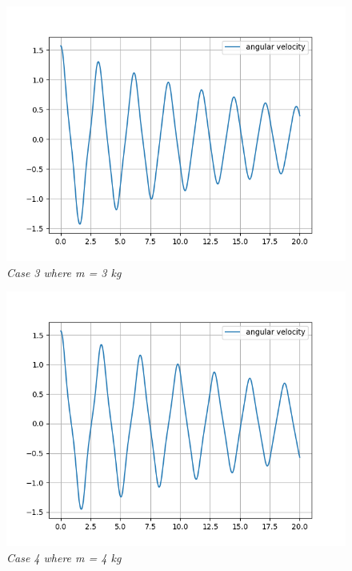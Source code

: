         \begin{figure}[H]
            \centering
            \includegraphics{Appendix/RSimPictures/A/am3.png}
            \caption{\textit{Case 3 where m = 3 kg}}
            \label{}
        \end{figure}
            
        \begin{figure}[H]
            \centering
            \includegraphics{Appendix/RSimPictures/A/am4.png}
            \caption{\textit{Case 4 where m = 4 kg}}
            \label{}
        \end{figure}
            
